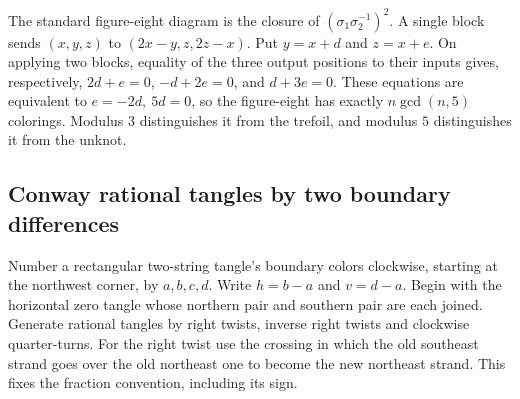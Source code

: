 The standard figure-eight diagram is the closure of
$(\sigma_1\sigma_2^{-1})^2$. A single block sends $(x,y,z)$ to
$(2x-y,z,2z-x)$. Put $y=x+d$ and $z=x+e$. On applying two blocks,
equality of the three output positions to their inputs gives, respectively,
$2d+e=0$, $-d+2e=0$, and $d+3e=0$. These equations are equivalent to
$e=-2d,\ 5d=0$, so the figure-eight has exactly $n\gcd(n,5)$ colorings.
Modulus $3$ distinguishes it from the trefoil, and modulus $5$ distinguishes
it from the unknot.

\subsection{Conway rational tangles by two boundary differences}

Number a rectangular two-string tangle's boundary colors clockwise,
starting at the northwest corner, by $a,b,c,d$. Write
$h=b-a$ and $v=d-a$. Begin with the horizontal zero tangle whose
northern pair and southern pair are each joined. Generate rational
tangles by right twists, inverse right twists and clockwise quarter-turns.
For the right twist use the crossing in which the old southeast strand
goes over the old northeast one to become the new northeast strand.
This fixes the fraction convention, including its sign.


